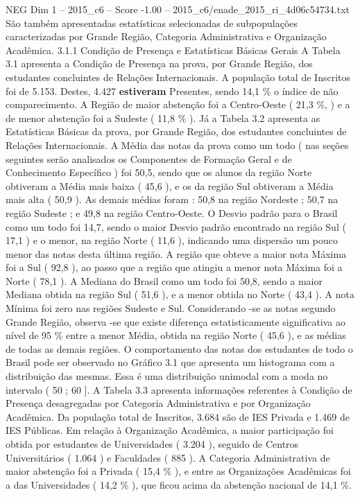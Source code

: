 \begin{textsample}{NEG Dim 1 – 2015\_c6 – Score -1.00 – 2015\_c6/enade\_2015\_ri\_4d06c54734.txt}
São também apresentadas estatísticas selecionadas de subpopulações caracterizadas por Grande Região, Categoria Administrativa e Organização Acadêmica. 3.1.1 Condição de Presença e Estatísticas Básicas Gerais A Tabela 3.1 apresenta a Condição de Presença na prova, por Grande Região, dos estudantes concluintes de Relações Internacionais.
A população total de Inscritos foi de 5.153.
Destes, 4.427 \textbf{estiveram} Presentes, sendo 14,1 \% o índice de não comparecimento.
A Região de maior abstenção foi a Centro-Oeste ( 21,3 \%, ) e a de menor abstenção foi a Sudeste ( 11,8 \% ).
Já a Tabela 3.2 apresenta as Estatísticas Básicas da prova, por Grande Região, dos estudantes concluintes de Relações Internacionais.
A Média das notas da prova como um todo ( nas seções seguintes serão analisados os Componentes de Formação Geral e de Conhecimento Específico ) foi 50,5, sendo que os alunos da região Norte obtiveram a Média mais baixa ( 45,6 ), e os da região Sul obtiveram a Média mais alta ( 50,9 ).
As demais médias foram : 50,8 na região Nordeste ; 50,7 na região Sudeste ; e 49,8 na região Centro-Oeste.
O Desvio padrão para o Brasil como um todo foi 14,7, sendo o maior Desvio padrão encontrado na região Sul ( 17,1 ) e o menor, na região Norte ( 11,6 ), indicando uma dispersão um pouco menor das notas desta última região.
A região que obteve a maior nota Máxima foi a Sul ( 92,8 ), ao passo que a região que atingiu a menor nota Máxima foi a Norte ( 78,1 ).
A Mediana do Brasil como um todo foi 50,8, sendo a maior Mediana obtida na região Sul ( 51,6 ), e a menor obtida no Norte ( 43,4 ).
A nota Mínima foi zero nas regiões Sudeste e Sul.
Considerando -se as notas segundo Grande Região, observa -se que existe diferença estatisticamente significativa ao nível de 95 \% entre a menor Média, obtida na região Norte ( 45,6 ), e as médias de todas as demais regiões.
O comportamento das notas dos estudantes de todo o Brasil pode ser observado no Gráfico 3.1 que apresenta um histograma com a distribuição das mesmas.
Essa é uma distribuição unimodal com a moda no intervalo ( 50 ; 60 ].
A Tabela 3.3 apresenta informações referentes à Condição de Presença desagregadas por Categoria Administrativa e por Organização Acadêmica.
Da população total de Inscritos, 3.684 são de IES Privada e 1.469 de IES Públicas.
Em relação à Organização Acadêmica, a maior participação foi obtida por estudantes de Universidades ( 3.204 ), seguido de Centros Universitários ( 1.064 ) e Faculdades ( 885 ).
A Categoria Administrativa de maior abstenção foi a Privada ( 15,4 \% ), e entre as Organizações Acadêmicas foi a das Universidades ( 14,2 \% ), que ficou acima da abstenção nacional de 14,1 \%.

\end{textsample}
